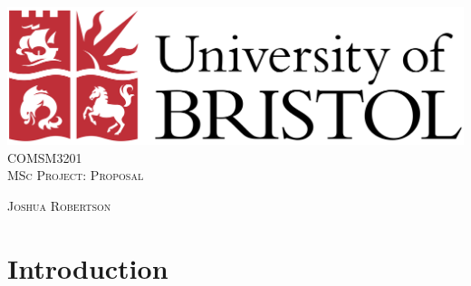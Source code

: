 \documentclass[12pt]{article}
\begin{document}
	
	\begin{titlepage}
		
		\newcommand{\HRule}{\rule{\linewidth}{0.5mm}} %
		
		\center %
		
		
	
	\includegraphics[scale=0.05]{logo.png}\\[1cm] %
		COMSM3201 \\[1 cm]
		\textsc{\Large MSc Project: Proposal}\\[12 cm] %

		
		
	
		

		
		\begin{center}
			
			\textsc{Joshua Robertson}
			\\
			

			
		\end{center}

		
	
		
		\vfill %
		
	\end{titlepage}

\section{Introduction}
\end{document}
